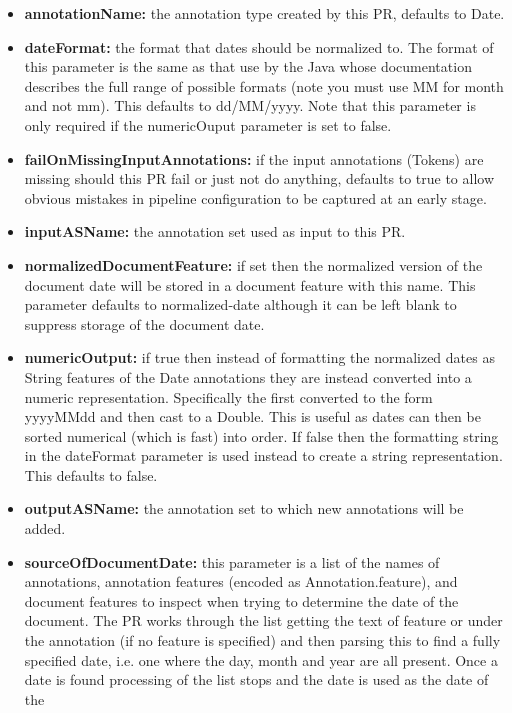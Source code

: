 \begin{itemize}
\item \textbf{annotationName:} the annotation type created by this PR, defaults
  to Date.
\item \textbf{dateFormat:} the format that dates should be normalized to. The
  format of this parameter is the same as that use by the Java
  whose documentation describes the full range of possible formats (note you
  must use MM for month and not mm). This defaults to dd/MM/yyyy.
  Note that this parameter is only required if the numericOuput parameter is set to false.
\item \textbf{failOnMissingInputAnnotations:} if the input annotations (Tokens)
  are missing should this PR fail or just not do anything, defaults to true to
  allow obvious mistakes in pipeline configuration to be captured at an early stage.
\item \textbf{inputASName:} the annotation set used as input to this PR.
\item \textbf{normalizedDocumentFeature:} if set then the normalized version
  of the document date will be stored in a document feature with this name.
  This parameter defaults to normalized-date although it can be left blank
  to suppress storage of the document date.  
\item \textbf{numericOutput:} if true then instead of formatting the normalized
  dates as String features of the Date annotations they are instead converted
  into a numeric representation. Specifically the first converted to the form
  yyyyMMdd and then cast to a Double. This is useful as dates can then be sorted
  numerical (which is fast) into order. If false then the formatting string
  in the dateFormat parameter is used instead to create a string representation.
  This defaults to false.
\item \textbf{outputASName:} the annotation set to which new annotations will
  be added.
\item \textbf{sourceOfDocumentDate:} this parameter is a list of the names of
  annotations, annotation features (encoded as Annotation.feature), and document
  features to inspect when trying to determine the date of the document. The PR
  works through the list getting the text of feature or under the annotation
  (if no feature is specified) and then parsing this to find a fully specified
  date, i.e. one where the day, month and year are all present. Once a date is
  found processing of the list stops and the date is used as the date of the

\end{itemize}
